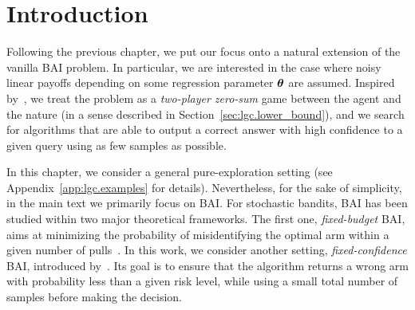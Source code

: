 \section{Introduction}\label{sec:lgc.intro}


Following the previous chapter, we put our focus onto a natural extension of the vanilla BAI problem. In particular, we are interested in the case where noisy linear payoffs depending on some regression parameter ${\boldsymbol \theta}$ are assumed. Inspired by~\citet{degenne2019game}, we treat the problem as a \emph{two-player zero-sum} game between the agent and the nature (in a sense described in Section~\ref{sec:lgc.lower_bound}), and we search for algorithms that are able to output a correct answer with high confidence to a given query using as few samples as possible.

In this chapter, we consider a general pure-exploration setting (see Appendix~\ref{app:lgc.examples} for details). Nevertheless, for the sake of simplicity, in the main text we primarily focus on BAI.  For stochastic bandits, BAI has been studied within two major theoretical frameworks. The first one,  \emph{fixed-budget} BAI, aims at minimizing the probability of misidentifying the optimal arm within a given number of pulls~\citep{audibert2010budget}. In this work, we consider another setting, \emph{fixed-confidence} BAI, introduced by~\citet{even-dar2003confidence}. Its goal is to ensure that the algorithm returns a wrong arm with probability less than a given risk level, while using a small total number of samples before making the decision. %

